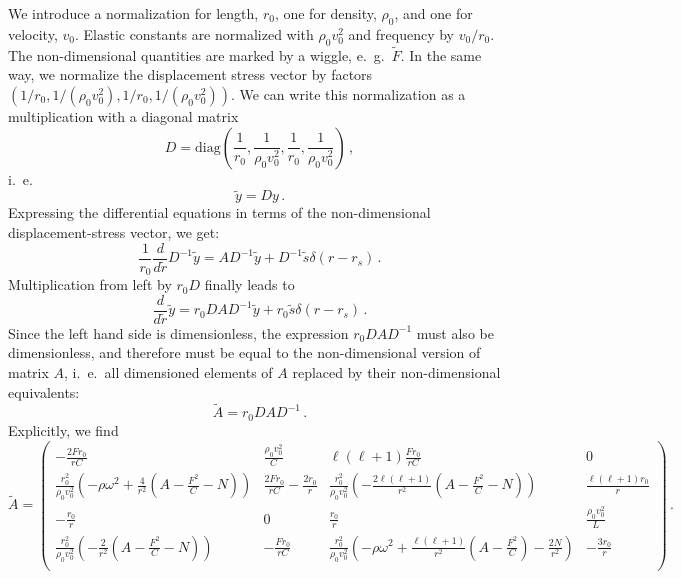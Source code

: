 \documentclass[11pt,a4paper]{article}
\begin{document}
%
We introduce a normalization for length, $r_0$, one for density, $\rho_0$, and one for velocity, $v_0$.
Elastic constants are normalized with $\rho_0v_0^2$ and frequency by $v_0/r_0$. The non-dimensional
quantities are marked by a wiggle, e.~g.~$\tilde{F}$. In the same way, we normalize the displacement
stress vector by factors $(1/r_0,1/(\rho_0v_0^2),1/r_0,1/(\rho_0v_0^2))$. We can write this normalization
as a multiplication with a diagonal matrix 
\begin{equation}
D = \mbox{diag}\left(\frac{1}{r_0},\frac{1}{\rho_0v_0^2},\frac{1}{r_0},\frac{1}{\rho_0v_0^2}\right) \,,
\end{equation}
i.~e.~
\begin{equation}
\tilde{y} = Dy \,.
\end{equation}
Expressing the differential equations in terms of the non-dimensional displacement-stress vector, we get:
\begin{equation}
\frac{1}{r_0}\frac{d}{d\tilde{r}}D^{-1}\tilde{y} = AD^{-1}\tilde{y}+D^{-1}\tilde{s}\delta(r-r_s) \,.
\end{equation}
Multiplication from left by $r_0D$ finally leads to
\begin{equation}
\frac{d}{d\tilde{r}}\tilde{y} = r_0DAD^{-1}\tilde{y}+r_0\tilde{s}\delta(r-r_s) \,.
\end{equation}
Since the left hand side is dimensionless, the expression $r_0DAD^{-1}$ must also be dimensionless,
and therefore must be equal to the non-dimensional version of matrix $A$, i.~e.~all dimensioned
elements of $A$ replaced by their non-dimensional equivalents:
\begin{equation}
\tilde{A} = r_0DAD^{-1} \,.
\end{equation}
Explicitly, we find
\begin{displaymath}
\tilde{A} = 
\left(\begin{array}{cccc}
-\frac{2Fr_0}{rC} & \frac{\rho_0v_0^2}{C} & \ell(\ell+1)\frac{Fr_0}{rC} & 0 \\
\frac{r_0^2}{\rho_0v_0^2}\left(-\rho\omega^2+\frac{4}{r^2}(A-\frac{F^2}{C}-N)\right) & \frac{2Fr_0}{rC}-\frac{2r_0}{r} & 
\frac{r_0^2}{\rho_0v_0^2}\left(-\frac{2\ell(\ell+1)}{r^2}(A-\frac{F^2}{C}-N)\right) & \frac{\ell(\ell+1)r_0}{r} \\
-\frac{r_0}{r} & 0 & \frac{r_0}{r} & \frac{\rho_0v_0^2}{L} \\
\frac{r_0^2}{\rho_0v_0^2}\left(-\frac{2}{r^2}(A-\frac{F^2}{C}-N)\right) & -\frac{Fr_0}{rC} & 
\frac{r_0^2}{\rho_0v_0^2}\left(-\rho\omega^2+\frac{\ell(\ell+1)}{r^2}(A-\frac{F^2}{C})-\frac{2N}{r^2}\right) & -\frac{3r_0}{r} \\
\end{array}\right) \,.
\end{displaymath}
\end{document}

